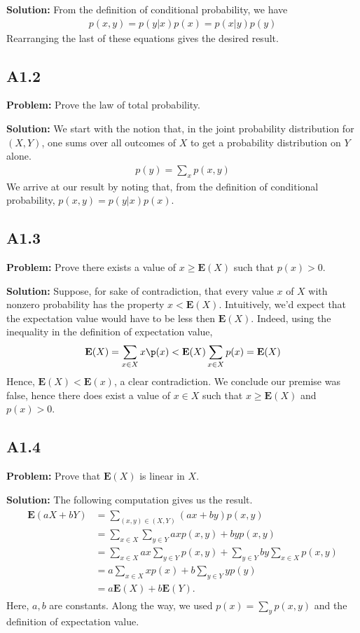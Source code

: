 \documentclass{article}
\begin{document}
\textbf{Solution:} From the definition of conditional probability, we have
\begin{align}
    p(x,y) = p(y|x)p(x) = p(x|y)p(y)
\end{align}
Rearranging the last of these equations gives the desired result.

\subsection*{A1.2}
\textbf{Problem:} Prove the law of total probability.

\textbf{Solution:} We start with the notion that, in the joint probability distribution for $(X,Y)$, one sums over all outcomes of $X$ to get a probability distribution on $Y$ alone.
\begin{align}
    p(y) = \sum_x p(x,y)
\end{align}
We arrive at our result by noting that, from the definition of conditional probability, $p(x,y) = p(y|x)p(x)$.

\subsection*{A1.3}
\textbf{Problem:} Prove there exists a value of $x\geq\textbf{E}(X)$ such that $p(x)>0$.

\textbf{Solution:} Suppose, for sake of contradiction, that every value $x$ of $X$ with nonzero probability has the property $x < \textbf{E}(X)$. Intuitively, we'd expect that the expectation value would have to be less then $\textbf{E}(X)$. Indeed, using the inequality in the definition of expectation value,
\begin{align}
    \textbf{E}(X) = \sum_{x\in X} x\p(x) < \textbf{E}(X)\sum_{x\in X}p(x) = \textbf{E}(X)
\end{align}
Hence, $\textbf{E}(X)<\textbf{E}(x)$, a clear contradiction. We conclude our premise was false, hence there does exist a value of $x\in X$ such that $x \geq \textbf{E}(X)$ and $p(x)>0$.

\subsection*{A1.4} 
\textbf{Problem:} Prove that $\textbf{E}(X)$ is linear in $X$.

\textbf{Solution:} The following computation gives us the result.
\begin{align}
\begin{aligned}
    \textbf{E}(aX+bY) &= \sum_{(x,y)\in(X,Y)}(ax+by)p(x,y) \\
    &= \sum_{x\in X}\sum_{y\in Y}axp(x,y) + byp(x,y) \\
    &=\sum_{x\in X}ax\sum_{y\in Y}p(x,y) + \sum_{y\in Y}by\sum_{x\in X}p(x,y) \\
    &=a\sum_{x\in X}x p(x) + b\sum_{y\in Y}yp(y) \\
    &=a\textbf{E}(X) + b\textbf{E}(Y).
\end{aligned}
\end{align}
Here, $a,b$ are constants. Along the way, we used $p(x) = \sum_y p(x,y)$ and the definition of expectation value.
\end{document}
